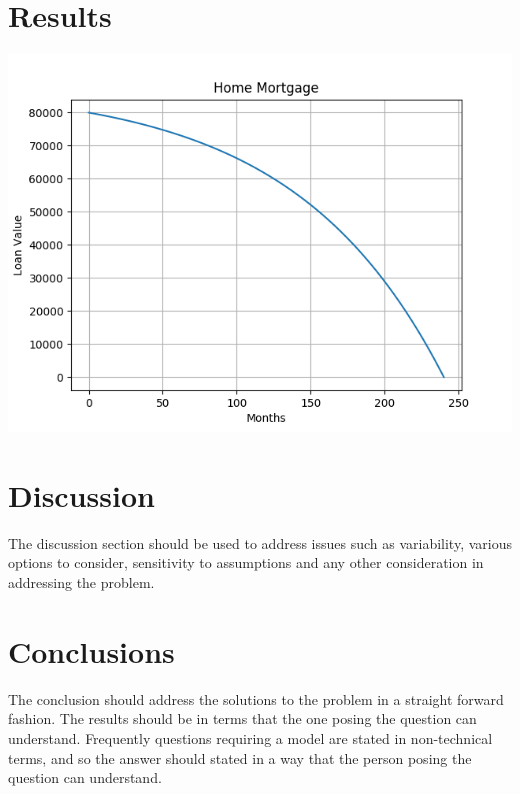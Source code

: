 \documentclass[12pt]{article} %
\begin{document}
\section*{Results}
\begin{center}
 

\includegraphics{homemortgage.png}
\end{center}

\section*{Discussion}
 The discussion section should be used to address issues such as variability, various options to consider, sensitivity to assumptions and any other consideration in addressing the problem.
 
\section*{Conclusions}
The conclusion should address the solutions to the problem in a straight forward fashion. The results should be in terms that the one posing the question can understand. Frequently questions requiring a model are stated in non-technical terms, and so the answer should stated in a way that the person posing the question can understand.
\end{document}
